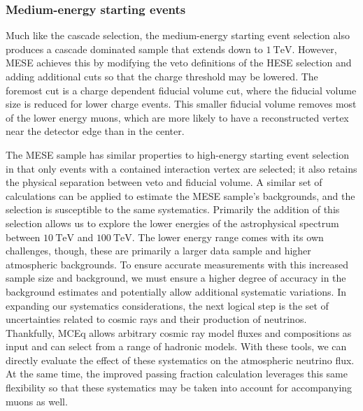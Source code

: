 \subsubsection{Medium-energy starting events}
Much like the cascade selection, the medium-energy starting event selection also produces a cascade dominated sample that extends down to $\SI{1}\TeV$.
However, MESE achieves this by modifying the veto definitions of the HESE selection and adding additional cuts so that the charge threshold may be lowered.
The foremost cut is a charge dependent fiducial volume cut, where the fiducial volume size is reduced for lower charge events.
This smaller fiducial volume removes most of the lower energy muons, which are more likely to have a reconstructed vertex near the detector edge than in the center.

The MESE sample has similar properties to high-energy starting event selection in that only events with a contained interaction vertex are selected; it also retains the physical separation between veto and fiducial volume.
A similar set of calculations can be applied to estimate the MESE sample's backgrounds, and the selection is susceptible to the same systematics.
Primarily the addition of this selection allows us to explore the lower energies of the astrophysical spectrum between $\SI{10}\TeV$ and $\SI{100}\TeV$.
The lower energy range comes with its own challenges, though, these are primarily a larger data sample and higher atmospheric backgrounds.
To ensure accurate measurements with this increased sample size and background, we must ensure a higher degree of accuracy in the background estimates and potentially allow additional systematic variations.
In expanding our systematics considerations, the next logical step is the set of uncertainties related to cosmic rays and their production of neutrinos.
Thankfully, MCEq allows arbitrary cosmic ray model fluxes and compositions as input and can select from a range of hadronic models. With these tools, we can directly evaluate the effect of these systematics on the atmospheric neutrino flux.
At the same time, the improved passing fraction calculation leverages this same flexibility so that these systematics may be taken into account for accompanying muons as well.

